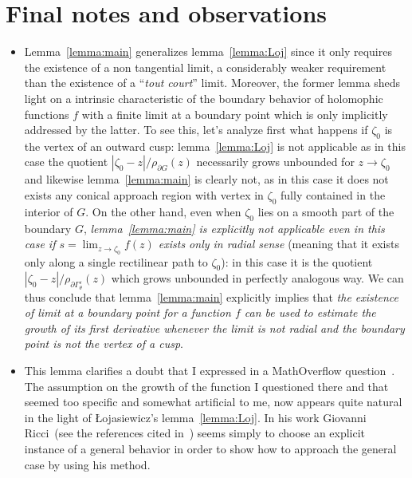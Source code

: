 \documentclass[a4paper,10pt]{article}
\begin{document}
\section{Final notes and observations}
\begin{itemize}
\item Lemma~\ref{lemma:main} generalizes lemma~\ref{lemma:Loj} since it only requires the existence of a non tangential limit, a considerably weaker requirement than the existence of a ``\emph{tout court}'' limit. Moreover, the former lemma sheds light on a intrinsic characteristic of the boundary behavior of holomophic functions $f$ with a finite limit at a boundary point which is only implicitly addressed by the latter. To see this, let's analyze first what happens if $\zeta_0$ is the vertex of an outward cusp: lemma~\ref{lemma:Loj} is not applicable as in this case the quotient $\left|\zeta_0-z\right| / \rho_{\partial G}(z)$ necessarily grows unbounded for $z\to\zeta_0$ and likewise lemma~\ref{lemma:main} is clearly not, as in this case it does not exists any conical approach region with vertex in $\zeta_0$ fully contained in the interior of $G$. On the other hand, even when $\zeta_0$ lies on a smooth part of the boundary $G$, \emph{lemma~\ref{lemma:main} is explicitly not applicable even in this case if $s=\lim_{z \to\zeta_0} f(z)$ exists only in radial sense} (meaning that it exists only along a single rectilinear path to $\zeta_0$): in this case it is the quotient  $\left|\zeta_0-z\right| / \rho_{\partial \Gamma_{\theta}^{\varepsilon}}(z)$ which grows unbounded in perfectly analogous way. We can thus conclude that lemma~\ref{lemma:main} explicitly implies that \emph{the existence of limit at a boundary point for a function $f$ can be used to estimate the growth of its first derivative whenever the limit is not radial and the boundary point is not the vertex of a cusp}.
\item This lemma clarifies a doubt that I expressed in a MathOverflow question~\cite{Tampieri2021}. The assumption on the growth of the function I questioned there and that seemed too specific and somewhat artificial to me, now appears quite natural in the light of Łojasiewicz's lemma~\ref{lemma:Loj}. In his work Giovanni Ricci~(see the references cited in~\cite{Tampieri2021}) seems simply to choose an explicit instance of a general behavior in order to show how to approach the general case by using his method.
\end{itemize}



\begin{versionhistory}
\end{versionhistory}
\end{document}
